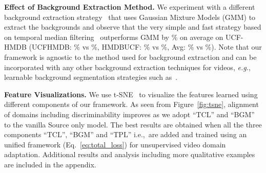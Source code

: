 \textbf{Effect of Background Extraction Method.} We experiment with a different background extraction strategy~\cite{zivkovic2004improved} that uses Gaussian Mixture Models (GMM) to extract the backgrounds and observe that the very simple and fast strategy based on temporal median filtering~\cite{piccardi2004background} outperforms GMM by \% on average on UCF-HMDB (UCFHMDB: \% vs \%, HMDBUCF: \% vs \%, Avg: \% vs \%). Note that our \ours framework is agnostic to the method used for background extraction and can be incorporated with any other background extraction techniques for videos, \textit{e.g.}, learnable background segmentation strategies such as~\cite{wang2018background,patil2021multi}. 



\begin{figure*}[t]
\captionsetup[subfigure]{labelformat=empty}
\centering
{}
\vspace{-2mm}
\caption{\small \textbf{Feature Visualizations using t-SNE.} Plots show visualization of our approach with different components on UCFHMDB task. \textcolor{blue}{Blue} and \textcolor{red}{red} dots represent source and target data respectively.  
Features for both target and source domain become progressively discriminative and improve from left to right by adoption of our novel components within a temporal contrastive learning framework. Best viewed in color.
} 
\label{fig:tsne} \vspace{-5mm}
\end{figure*} 
\textbf{Feature Visualizations.} We use t-SNE~\cite{maaten2008visualizing} to visualize the features learned using different components of our \ours framework. 
As seen from Figure~\ref{fig:tsne}, alignment of domains including discriminability improves as we adopt \enquote{TCL} and \enquote{BGM} to the vanilla Source only model. The best results are obtained when all the three components \enquote{TCL}, \enquote{BGM} and \enquote{TPL} i.e.,~\ours are added and trained using an unified framework (Eq.~\ref{eq:total_loss}) for unsupervised video domain adaptation.
Additional results and analysis including more qualitative examples are included in the appendix.


